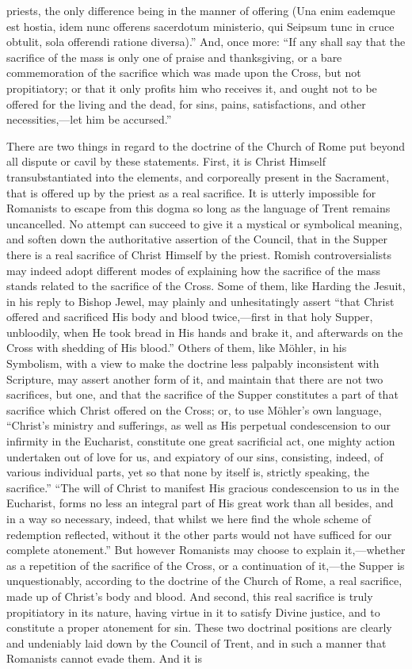 \documentclass[]{book}
\begin{document}
priests, the only difference being in the manner of offering (Una enim eademque est hostia, idem nunc offerens sacerdotum ministerio, qui Seipsum tunc in cruce obtulit, sola offerendi ratione diversa).'' And, once more: ``If any shall say that the sacrifice of the mass is only one of praise and thanksgiving, or a bare commemoration of the sacrifice which was made upon the Cross, but not propitiatory; or that it only profits him who receives it, and ought not to be offered for the living and the dead, for sins, pains, satisfactions, and other necessities,---let him be accursed.''

There are two things in regard to the doctrine of the Church of Rome put beyond all dispute or cavil by these statements. First, it is Christ Himself transubstantiated into the elements, and corporeally present in the Sacrament, that is offered up by the priest as a real sacrifice. It is utterly impossible for Romanists to escape from this dogma so long as the language of Trent remains uncancelled. No attempt can succeed to give it a mystical or symbolical meaning, and soften down the authoritative assertion of the Council, that in the Supper there is a real sacrifice of Christ Himself by the priest. Romish controversialists may indeed adopt different modes of explaining how the sacrifice of the mass stands related to the sacrifice of the Cross. Some of them, like Harding the Jesuit, in his reply to Bishop Jewel, may plainly and unhesitatingly assert ``that Christ offered and sacrificed His body and blood twice,---first in that holy Supper, unbloodily, when He took bread in His hands and brake it, and afterwards on the Cross with shedding of His blood.'' Others of them, like Möhler, in his Symbolism, with a view to make the doctrine less palpably inconsistent with Scripture, may assert another form of it, and maintain that there are not two sacrifices, but one, and that the sacrifice of the Supper constitutes a part of that sacrifice which Christ offered on the Cross; or, to use Möhler's own language, ``Christ's ministry and sufferings, as well as His perpetual condescension to our infirmity in the Eucharist, constitute one great sacrificial act, one mighty action undertaken out of love for us, and expiatory of our sins, consisting, indeed, of various individual parts, yet so that none by itself is, strictly speaking, the sacrifice.'' ``The will of Christ to manifest His gracious condescension to us in the Eucharist, forms no less an integral part of His great work than all besides, and in a way so necessary, indeed, that whilst we here find the whole scheme of redemption reflected, without it the other parts would not have sufficed for our complete atonement.'' But however Romanists may choose to explain it,---whether as a repetition of the sacrifice of the Cross, or a continuation of it,---the Supper is unquestionably, according to the doctrine of the Church of Rome, a real sacrifice, made up of Christ's body and blood. And second, this real sacrifice is truly propitiatory in its nature, having virtue in it to satisfy Divine justice, and to constitute a proper atonement for sin. These two doctrinal positions are clearly and undeniably laid down by the Council of Trent, and in such a manner that Romanists cannot evade them. And it is 
\end{document}
